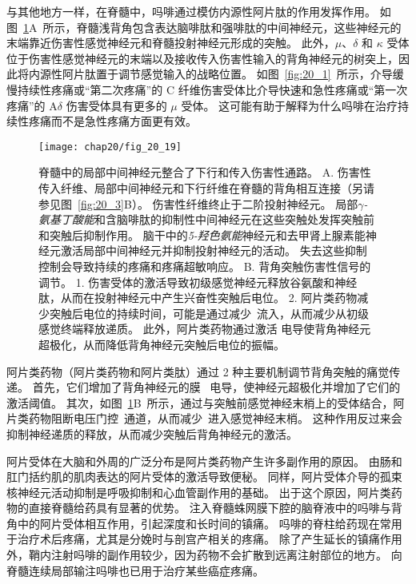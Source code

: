 与其他地方一样，在脊髓中，吗啡通过模仿内源性阿片肽的作用发挥作用。
如图~\ref{fig:20_19}A~所示，脊髓浅背角包含表达脑啡肽和强啡肽的中间神经元，这些神经元的末端靠近伤害性感觉神经元和脊髓投射神经元形成的突触。
此外，$\mu$、$\delta$ 和 $ \kappa $ 受体位于伤害性感觉神经元的末端以及接收传入伤害性输入的背角神经元的树突上，因此将内源性阿片肽置于调节感觉输入的战略位置。
如图~\ref{fig:20_1}~所示，介导缓慢持续性疼痛或“第二次疼痛”的 C 纤维伤害受体比介导快速和急性疼痛或“第一次疼痛”的 A$\delta$ 伤害受体具有更多的 $\mu$ 受体。
这可能有助于解释为什么吗啡在治疗持续性疼痛而不是急性疼痛方面更有效。


\begin{figure}[htbp]
	\centering
	\texttt{[image: chap20/fig\_20\_19]}
	\caption{脊髓中的局部中间神经元整合了下行和传入伤害性通路。
		A. 伤害性传入纤维、局部中间神经元和下行纤维在脊髓的背角相互连接（另请参见图~\ref{fig:20_3}B）。
		伤害性纤维终止于二阶投射神经元。
		局部\textit{$\gamma$-氨基丁酸能}和含脑啡肽的抑制性中间神经元在这些突触处发挥突触前和突触后抑制作用。
		脑干中的\textit{5-羟色氨能}神经元和去甲肾上腺素能神经元激活局部中间神经元并抑制投射神经元的活动。
		失去这些抑制控制会导致持续的疼痛和疼痛超敏响应。
		B. 背角突触伤害性信号的调节。
		1. 伤害受体的激活导致初级感觉神经元释放谷氨酸和神经肽，从而在投射神经元中产生兴奋性突触后电位。
		2. 阿片类药物减少突触后电位的持续时间，可能是通过减少~流入，从而减少从初级感觉终端释放递质。
		此外，阿片类药物通过激活  电导使背角神经元超极化，从而降低背角神经元突触后电位的振幅。}
	\label{fig:20_19}
\end{figure}


阿片类药物（阿片类药物和阿片类肽）通过 2 种主要机制调节背角突触的痛觉传递。
首先，它们增加了背角神经元的膜~ 电导，使神经元超极化并增加了它们的激活阈值。
其次，如图~\ref{fig:20_19}B~所示，通过与突触前感觉神经末梢上的受体结合，阿片类药物阻断电压门控~通道，从而减少~进入感觉神经末梢。
这种作用反过来会抑制神经递质的释放，从而减少突触后背角神经元的激活。


阿片受体在大脑和外周的广泛分布是阿片类药物产生许多副作用的原因。
由肠和肛门括约肌的肌肉表达的阿片受体的激活导致便秘。
同样，阿片受体介导的孤束核神经元活动抑制是呼吸抑制和心血管副作用的基础。
出于这个原因，阿片类药物的直接脊髓给药具有显著的优势。
注入脊髓蛛网膜下腔的脑脊液中的吗啡与背角中的阿片受体相互作用，引起深度和长时间的镇痛。
吗啡的脊柱给药现在常用于治疗术后疼痛，尤其是分娩时与剖宫产相关的疼痛。
除了产生延长的镇痛作用外，鞘内注射吗啡的副作用较少，因为药物不会扩散到远离注射部位的地方。
向脊髓连续局部输注吗啡也已用于治疗某些癌症疼痛。


